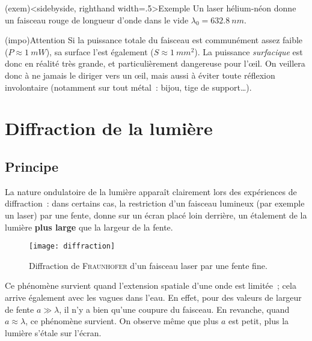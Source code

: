 \documentclass[../../main/main.tex]{subfiles}
\begin{document}
\begin{tcb}(exem)<sidebyside, righthand width=.5\linewidth>{Exemple}
	Un laser hélium-néon donne un faisceau rouge de longueur d'onde dans le vide
	$\lambda_0 = \SI{632.8}{nm}$.
	\tcblower
	\begin{center}
		\pgfspectra[lines={632.8},
		axis, axis color=white, axis font color=black,
		axis ticks=4, axis unit precision=2,
		axis label text={Longueur d'onde [$\si{nm}$]},
		back=white,
		label, label position=north west,
		label before text=Spectre d'émission d'un laser \ce{He-Ne}]
		\label{fig:laser_spec}
	\end{center}
\end{tcb}
\begin{tcb}(impo){Attention}
	Si la puissance totale du faisceau est communément assez faible ($P \approx
		\SI{1}{mW}$), sa surface l'est également ($S \approx \SI{1}{mm^2}$). La
	puissance \textit{surfacique} est donc en réalité très grande, et
	particulièrement dangereuse pour l'œil. On veillera donc à ne jamais le
	diriger vers un œil, mais aussi à éviter toute réflexion involontaire
	(notamment sur tout métal~: bijou, tige de support…).
\end{tcb}

\section{Diffraction de la lumière}

\subsection{Principe}

La nature ondulatoire de la lumière apparaît clairement lors des expériences de
diffraction~: dans certains cas, la restriction d'un faisceau lumineux (par
exemple un laser) par une fente, donne sur un écran placé loin derrière, un
étalement de la lumière \textbf{plus large} que la largeur de la fente.

\begin{figure}[h]
	\centering
	\texttt{[image: diffraction]}
	\captionsetup{justification=centering}
	\caption{Diffraction de \textsc{Fraunhofer} d'un faisceau laser par une
		fente fine.}
	\label{fig:diff_las}
\end{figure}

Ce phénomène survient quand l'extension spatiale d'une onde est limitée~; cela
arrive également avec les vagues dans l'eau. En effet, pour des valeurs de
largeur de fente $a \gg \lambda$, il n'y a bien qu'une coupure du faisceau. En
revanche, quand $a \approx \lambda$, ce phénomène survient. On observe même que
plus $a$ est petit, plus la lumière s'étale sur l'écran.
\end{document}

